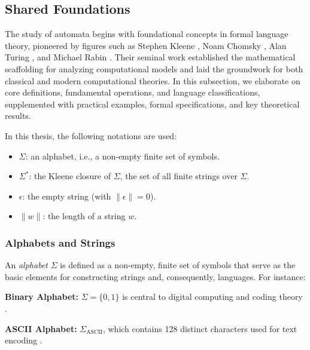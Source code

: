 \subsection{Shared Foundations}
\label{subsec:shared-foundations}

The study of automata begins with foundational concepts in formal language theory, pioneered by figures such as Stephen Kleene \cite{kleene1956representation}, Noam Chomsky \cite{chomsky1956three}, Alan Turing \cite{hopcroft2006introduction}, and Michael Rabin \cite{rabin1963probabilistic}. Their seminal work established the mathematical scaffolding for analyzing computational models and laid the groundwork for both classical and modern computational theories. In this subsection, we elaborate on core definitions, fundamental operations, and language classifications, supplemented with practical examples, formal specifications, and key theoretical results.

\begin{notation}[Symbols]
In this thesis, the following notations are used:
\begin{itemize}
    \item $\Sigma$: an alphabet, i.e., a non-empty finite set of symbols.
    \item $\Sigma^\ast$: the Kleene closure of $\Sigma$, the set of all finite strings over $\Sigma$.
    \item $\epsilon$: the empty string (with $\|\epsilon\| = 0$).
    \item $\|w\|$: the length of a string $w$.
\end{itemize}
\end{notation}

\subsubsection{Alphabets and Strings}
An \textit{alphabet} $\Sigma$ is defined as a non-empty, finite set of symbols that serve as the basic elements for constructing strings and, consequently, languages. For instance:

\begin{example}
\textbf{Binary Alphabet:} $\Sigma = \{0, 1\}$ is central to digital computing and coding theory \cite{hopcroft2006introduction}.
\end{example}

\begin{example}
\textbf{ASCII Alphabet:} $\Sigma_{\text{ASCII}}$, which contains 128 distinct characters used for text encoding \cite{cady1986ascii}.
\end{example}


